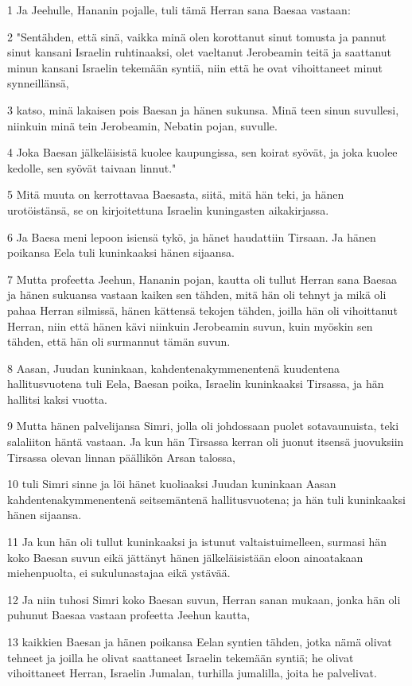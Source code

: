 \par 1 Ja Jeehulle, Hananin pojalle, tuli tämä Herran sana Baesaa vastaan:
\par 2 "Sentähden, että sinä, vaikka minä olen korottanut sinut tomusta ja pannut sinut kansani Israelin ruhtinaaksi, olet vaeltanut Jerobeamin teitä ja saattanut minun kansani Israelin tekemään syntiä, niin että he ovat vihoittaneet minut synneillänsä,
\par 3 katso, minä lakaisen pois Baesan ja hänen sukunsa. Minä teen sinun suvullesi, niinkuin minä tein Jerobeamin, Nebatin pojan, suvulle.
\par 4 Joka Baesan jälkeläisistä kuolee kaupungissa, sen koirat syövät, ja joka kuolee kedolle, sen syövät taivaan linnut."
\par 5 Mitä muuta on kerrottavaa Baesasta, siitä, mitä hän teki, ja hänen urotöistänsä, se on kirjoitettuna Israelin kuningasten aikakirjassa.
\par 6 Ja Baesa meni lepoon isiensä tykö, ja hänet haudattiin Tirsaan. Ja hänen poikansa Eela tuli kuninkaaksi hänen sijaansa.
\par 7 Mutta profeetta Jeehun, Hananin pojan, kautta oli tullut Herran sana Baesaa ja hänen sukuansa vastaan kaiken sen tähden, mitä hän oli tehnyt ja mikä oli pahaa Herran silmissä, hänen kättensä tekojen tähden, joilla hän oli vihoittanut Herran, niin että hänen kävi niinkuin Jerobeamin suvun, kuin myöskin sen tähden, että hän oli surmannut tämän suvun.
\par 8 Aasan, Juudan kuninkaan, kahdentenakymmenentenä kuudentena hallitusvuotena tuli Eela, Baesan poika, Israelin kuninkaaksi Tirsassa, ja hän hallitsi kaksi vuotta.
\par 9 Mutta hänen palvelijansa Simri, jolla oli johdossaan puolet sotavaunuista, teki salaliiton häntä vastaan. Ja kun hän Tirsassa kerran oli juonut itsensä juovuksiin Tirsassa olevan linnan päällikön Arsan talossa,
\par 10 tuli Simri sinne ja löi hänet kuoliaaksi Juudan kuninkaan Aasan kahdentenakymmenentenä seitsemäntenä hallitusvuotena; ja hän tuli kuninkaaksi hänen sijaansa.
\par 11 Ja kun hän oli tullut kuninkaaksi ja istunut valtaistuimelleen, surmasi hän koko Baesan suvun eikä jättänyt hänen jälkeläisistään eloon ainoatakaan miehenpuolta, ei sukulunastajaa eikä ystävää.
\par 12 Ja niin tuhosi Simri koko Baesan suvun, Herran sanan mukaan, jonka hän oli puhunut Baesaa vastaan profeetta Jeehun kautta,
\par 13 kaikkien Baesan ja hänen poikansa Eelan syntien tähden, jotka nämä olivat tehneet ja joilla he olivat saattaneet Israelin tekemään syntiä; he olivat vihoittaneet Herran, Israelin Jumalan, turhilla jumalilla, joita he palvelivat.
